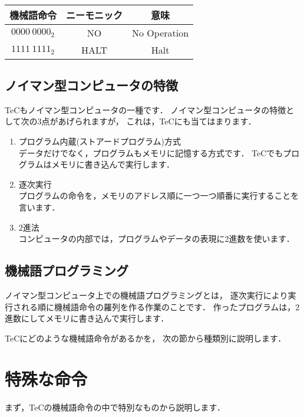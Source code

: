 {\tt
\begin{center}
\begin{tabular}{|c|c|c|} \hline
機械語命令 & ニーモニック & 意味\\
\hline
$0000~0000_{2}$ & NO & No Operation \\
$1111~1111_{2}$ & HALT & Halt \\
\hline
\end{tabular}
\end{center}
}

\subsection{ノイマン型コンピュータの特徴}
TeCもノイマン型コンピュータの一種です．
ノイマン型コンピュータの特徴として次の3点があげられますが，
これは，TeCにも当てはまります．
\begin{enumerate}
\item プログラム内蔵(ストアードプログラム)方式 \\
データだけでなく，プログラムもメモリに記憶する方式です．
TeCでもプログラムはメモリに書き込んで実行します．
\item 逐次実行 \\
プログラムの命令を，メモリのアドレス順に一つ一つ順番に実行することを言います．
\item 2進法 \\
コンピュータの内部では，プログラムやデータの表現に2進数を使います．
\end{enumerate}

\subsection{機械語プログラミング}
ノイマン型コンピュータ上での機械語プログラミングとは，
逐次実行により実行される順に機械語命令の羅列を作る作業のことです．
作ったプログラムは，2進数にしてメモリに書き込んで実行します．

TeCにどのような機械語命令があるかを，
次の節から種類別に説明します．

\section{特殊な命令}
まず，TeCの機械語命令の中で特別なものから説明します．

